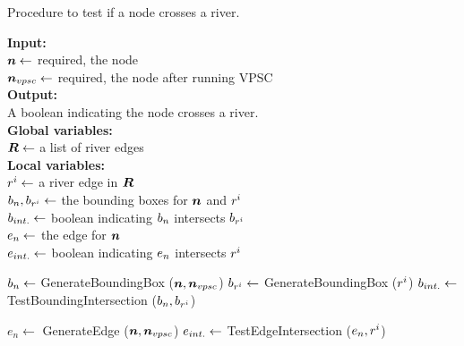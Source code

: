 \begin{algorithm}[tb!]
    \caption{Procedure to test if a node crosses a river.}\label{alg:check river crossing}
    \textbf{Input:} \\
    $ \bm{n} \gets $ required, the node \\
    $ \bm{n}_{vpsc} \gets $ required, the node after running VPSC \\

    \textbf{Output:} \\
    A boolean indicating the node crosses a river. \\

    \textbf{Global variables:} \\
    $ \bm{R} \gets $ a list of river edges \\

    \textbf{Local variables:} \\
    $ r^i \gets $ a river edge in $ \bm{R} $ \\ 
    $ b_n, b_{r^i} \gets $ the bounding boxes for $ \bm{n} $ and $ r^i $ \\
    $ b_{int.} \gets $ boolean indicating $ b_n $ intersects $ b_{r^i} $ \\
    $ e_n \gets $ the edge for $ \bm{n} $\\
    $ e_{int.} \gets $ boolean indicating $ e_n $ intersects $ r^i $ \\

    \begin{algorithmic}[1]
        
        \ForEach{$ \riverEdgeListEach \in \riverEdgeList $}
            \State $ b_n \gets $ GenerateBoundingBox ($ \bm{n}, \bm{n}_{vpsc} $)
            \State $ b_{r^i} \gets $ GenerateBoundingBox ($ r^i $)
            \State $ b_{int.} \gets $ TestBoundingIntersection ($ b_n, b_{r^i} $)
            
                \State $ e_{n} \gets $ GenerateEdge ($ \bm{n}, \bm{n}_{vpsc} $)
                \State $ e_{int.} \gets $ TestEdgeIntersection ($ e_n, r^i $)
                
                    \State {}
                \EndIf
            
                \EndIf
        \EndFor
        
        \State {}
        \EndProcedure
    \end{algorithmic}
\end{algorithm}

